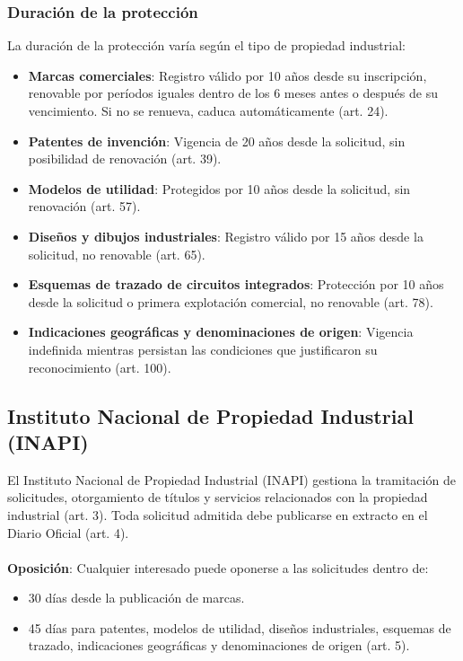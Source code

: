 \documentclass{templateNote}
\begin{document}
\subsubsection{Duración de la protección}
La duración de la protección varía según el tipo de propiedad industrial:
\begin{itemize}
    \item \textbf{Marcas comerciales}: Registro válido por 10 años desde su inscripción, renovable por períodos iguales dentro de los 6 meses antes o después de su vencimiento. Si no se renueva, caduca automáticamente (art. 24).
    \item \textbf{Patentes de invención}: Vigencia de 20 años desde la solicitud, sin posibilidad de renovación (art. 39).
    \item \textbf{Modelos de utilidad}: Protegidos por 10 años desde la solicitud, sin renovación (art. 57).
    \item \textbf{Diseños y dibujos industriales}: Registro válido por 15 años desde la solicitud, no renovable (art. 65).
    \item \textbf{Esquemas de trazado de circuitos integrados}: Protección por 10 años desde la solicitud o primera explotación comercial, no renovable (art. 78).
    \item \textbf{Indicaciones geográficas y denominaciones de origen}: Vigencia indefinida mientras persistan las condiciones que justificaron su reconocimiento (art. 100).
\end{itemize}

\subsection{Instituto Nacional de Propiedad Industrial (INAPI)}

El Instituto Nacional de Propiedad Industrial (INAPI) gestiona la tramitación de solicitudes, otorgamiento de títulos y servicios relacionados con la propiedad industrial (art. 3). Toda solicitud admitida debe publicarse en extracto en el Diario Oficial (art. 4).
\\\\
\noindent\textbf{Oposición}: Cualquier interesado puede oponerse a las solicitudes dentro de:
\begin{itemize}
    \item 30 días desde la publicación de marcas.
    \item 45 días para patentes, modelos de utilidad, diseños industriales, esquemas de trazado, indicaciones geográficas y denominaciones de origen (art. 5).
\end{itemize}
\end{document}
